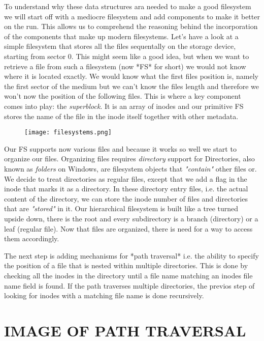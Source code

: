To understand why these data structures ara needed to make a good filesystem we will start off with a
mediocre filesystem and add components to make it better on the run. This allows us to comprehend the 
reasoning behind the incorporation of the components that make up modern filesystems.
Let's have a look at a simple filesystem that stores all the files sequentally on the storage device,
starting from sector 0. This might seem like a good idea, but when we want to retrieve a file from
such a filesystem (now *FS* for short) we would not know where it is located exactly. We would know
what the first files position is, namely the first sector of the medium but we can't know the files
length and therefore we won't now the  position of the following files. This is where a key component
comes into play: the \textit{superblock}. It is an array of inodes and our primitive FS stores the name of
the file in the inode itself together with other metadata.

\begin{figure}[h]
	\texttt{[image: filesystems.png]}
	\centering
\end{figure}

Our FS supports now various files and
because it works so well we start to organize our files. Organizing files requires \textit{directory}
support for Directories, also known as \textit{folders} on Windows, are filesystem objects that
\textit{"contain"} other files or. We decide to treat directories as regular files, except that we
add a flag in the inode that marks it as a directory. In these directory entry files, i.e. the actual
content of the directory, we can store the inode number of files and directories that are \textit{"stored"}
in it. Our hierarchical filesystem is built like a tree turned upside down, there is the root and every
subdirectory is a branch (directory) or a leaf (regular file). Now that files are organized, there is need
for a way to access them accordingly.

The next step is adding mechanisms for *path traversal* i.e. the
ability to specify the position of a file that is nested within multiple directories. This is done by
checking all the inodes in the directory until a file name matching an inodes file name field is
found. If the path traverses multiple directories, the previos step of looking for inodes with a
matching file name is done recursively.

\section{IMAGE OF PATH TRAVERSAL}

